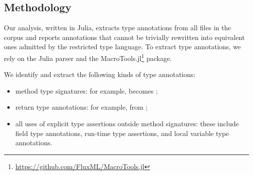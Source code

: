 


\subsection{Methodology} 
Our analysis, written in Julia, extracts type annotations from all 
files in the corpus and reports annotations that cannot be trivially rewritten 
into equivalent ones admitted by the restricted type language.
To extract type annotations, we rely on the Julia parser and 
the MacroTools.jl\footnote{\url{https://github.com/FluxML/MacroTools.jl}} package.


We identify and extract the following kinds of type annotations:
\begin{itemize}
    \item method type signatures: for example, 
     becomes
    ;
    \item return type annotations: for example,  from ;
    \item all uses of explicit type assertions  outside method
      signatures: these include field
      type annotations, run-time type assertions, and local variable
      type annotations.
\end{itemize}

